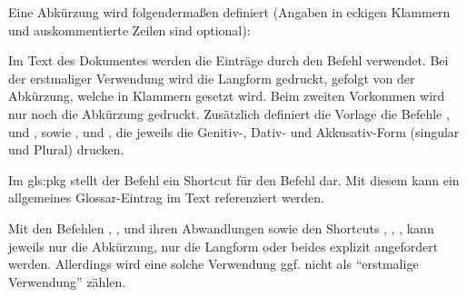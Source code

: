 Eine Abkürzung wird folgendermaßen definiert (Angaben in eckigen Klammern und auskommentierte Zeilen sind optional):
\begin{latex}[caption={Definition einer Abkürzung},label={lst:AcronymEntry}]
\end{latex}

Im Text des Dokumentes werden die Einträge durch den Befehl  verwendet.
Bei der erstmaliger Verwendung wird die Langform gedruckt, gefolgt von der Abkürzung, welche in Klammern gesetzt wird.
Beim zweiten Vorkommen wird nur noch die Abkürzung gedruckt.
Zusätzlich definiert die Vorlage die Befehle
,  und , sowie
,  und ,
die jeweils die Genitiv-, Dativ- und Akkusativ-Form (singular und Plural) drucken.

Im \gls{gls:pkg}  stellt der Befehl  ein Shortcut für den Befehl  dar.
Mit diesem kann ein allgemeines Glossar-Eintrag im Text referenziert werden.

Mit den Befehlen
, , 
und ihren Abwandlungen sowie den Shortcuts
, , ,
kann jeweils nur die Abkürzung, nur die Langform oder beides explizit angefordert werden.
Allerdings wird eine solche Verwendung ggf. nicht als \enquote{erstmalige Verwendung} zählen.

